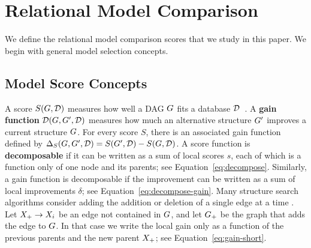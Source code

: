 \documentclass[letterpaper]{article}
\begin{document}
\section{Relational Model Comparison} 

We define the relational  model comparison scores that we study in this paper. We begin with general model selection concepts. 
%
\subsection{Model Score Concepts} 

A score $S(G,\mathcal{D})$ measures how well a DAG $G$ fits a database $\mathcal{D}$~\cite{Chickering2003}.  A \textbf{gain function} $\mathcal{D}(G,G',\mathcal{D})$ measures how much an alternative structure $G'$ improves a current structure $G$. For  every score $S$, there is an associated gain function  defined by $\Delta_{S}(G,G',\mathcal{D}) = S(G',\mathcal{D}) - S(G,\mathcal{D})$. 
%
%
A score function is \textbf{decomposable} if it can be written as a sum of local scores $s$, each of which is a function only of one node and its parents; see Equation~\eqref{eq:decompose}. Similarly, a gain function is decomposable if the improvement can be written as a sum of local improvements $\delta$; see Equation~\eqref{eq:decompose-gain}. Many structure search algorithms consider adding the addition or deletion of a single edge at a time \cite{Chickering2003}. Let $X_{+}\rightarrow X_{i}$ be an edge not contained in $G$, and let $G_{+}$ be the graph that adds the edge to $G$. In that case we write the local gain only as a function of the previous parents and the new parent $X_{+}$; see Equation~\eqref{eq:gain-short}. 
\end{document}
